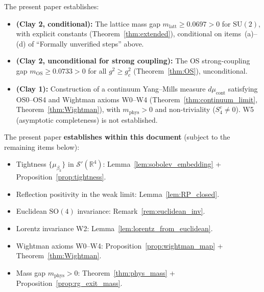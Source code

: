 \documentclass[11pt,a4paper]{amsart}
\theoremstyle{definition}
\newcommand{\SU}{\mathrm{SU}}
\newcommand{\R}{\mathbb{R}}
\begin{document}
\noindent The present paper establishes:
\begin{itemize}
\item \textbf{(Clay 2, conditional):}
      The lattice mass gap $m_{\mathrm{latt}} \ge 0.0697 > 0$ for $\SU(2)$,
      with explicit constants (Theorem~\ref{thm:extended}), conditional on items~(a)--(d)
      of ``Formally unverified steps'' above.
\item \textbf{(Clay 2, unconditional for strong coupling):}
      The OS strong-coupling gap $m_{\mathrm{OS}} \ge 0.0733 > 0$ for all $g^2 \ge g^2_c$
      (Theorem~\ref{thm:OS}), unconditional.
\item \textbf{(Clay 1):}
      Construction of a continuum Yang--Mills measure $d\mu_{\mathrm{cont}}$
      satisfying OS0--OS4 and Wightman axioms W0--W4
      (Theorem~\ref{thm:continuum_limit}, Theorem~\ref{thm:Wightman}),
      with $m_{\mathrm{phys}} > 0$ and non-triviality ($S_4^c \ne 0$).
      W5 (asymptotic completeness) is not established.
\end{itemize}

\noindent The present paper \textbf{establishes within this document}
\textup{(}subject to the remaining items below\textup{)}:
\begin{itemize}
\item Tightness $\{\mu_{\beta_k}\}$ in $\mathcal{S}'(\R^4)$:
      Lemma~\ref{lem:sobolev_embedding} + Proposition~\ref{prop:tightness}. \checkmark
\item Reflection positivity in the weak limit:
      Lemma~\ref{lem:RP_closed}. \checkmark
\item Euclidean $\mathrm{SO}(4)$ invariance:
      Remark~\ref{rem:euclidean_inv}. \checkmark
\item Lorentz invariance W2:
      Lemma~\ref{lem:lorentz_from_euclidean}. \checkmark
\item Wightman axioms W0--W4:
      Proposition~\ref{prop:wightman_map} + Theorem~\ref{thm:Wightman}. \checkmark
\item Mass gap $m_{\mathrm{phys}} > 0$:
      Theorem~\ref{thm:phys_mass} + Proposition~\ref{prop:rg_exit_mass}. \checkmark
\end{itemize}
\end{document}
